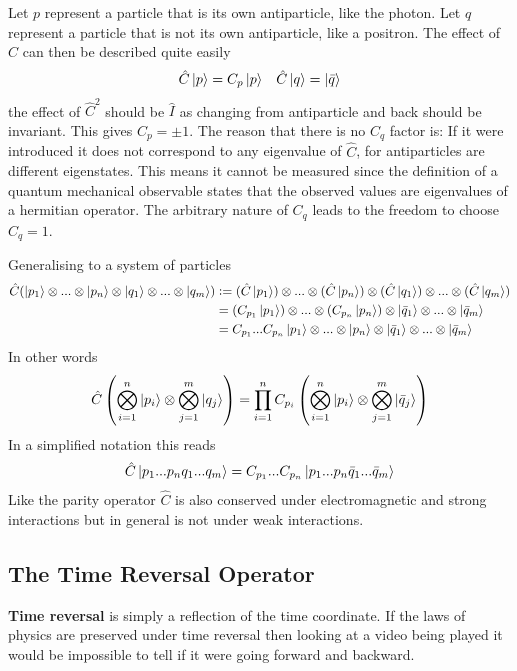 Let $p$ represent a particle that is its own antiparticle, like the photon. Let $q$ represent a particle that is not its own antiparticle, like a positron. The effect of $\hat{C}$ can then be described quite easily
\begin{align*}
&\hat{C}\ket{p} = C_p \ket{p}   &\hat{C}\ket{q} = \ket{\bar{q}}
\end{align*}
the effect of $\hat{C}^2$ should be $\hat{I}$ as changing from antiparticle and back should be invariant. This gives $C_p= \pm 1$. The reason that there is no $C_q$ factor is: If it were introduced it does not correspond to any eigenvalue of $\hat{C}$, for antiparticles are different eigenstates. This means it cannot be measured since the definition of a quantum mechanical observable states that the observed values are eigenvalues of a hermitian operator. The arbitrary nature of $C_q$ leads to the freedom to choose $C_q=1$.

Generalising to a system of particles
\begin{align*}
\hat{C}(\ket{p_1}\otimes...\otimes\ket{p_n}\otimes\ket{q_1}\otimes...\otimes\ket{q_m}) &\vcentcolon= (\hat{C}\ket{p_1})\otimes...\otimes(\hat{C}\ket{p_n})\otimes(\hat{C}\ket{q_1})\otimes...\otimes(\hat{C}\ket{q_m}) \\
&= (C_{p_1}\ket{p_1})\otimes...\otimes(C_{p_n}\ket{p_n})\otimes\ket{\bar{q}_1}\otimes...\otimes\ket{\bar{q}_m}  \\
&= C_{p_1}...C_{p_n}\ket{p_1}\otimes...\otimes\ket{p_n}\otimes\ket{\bar{q}_1}\otimes...\otimes\ket{\bar{q}_m}  
\end{align*}
In other words
\begin{align*}
\hat{C}\left(\bigotimes_{i=1}^n\ket{p_i} \otimes \bigotimes_{j=1}^m \ket{q_j} \right) = \prod_{i=1}^n C_{p_i} \left(\bigotimes_{i=1}^n\ket{p_i} \otimes \bigotimes_{j=1}^m \ket{\bar{q}_j} \right)
\end{align*}
In a simplified notation this reads
\begin{align*}
\hat{C}\ket{p_1...p_nq_1...q_m}=C_{p_1}...C_{p_n}\ket{p_1...p_n\bar{q}_1...\bar{q}_m}
\end{align*}
Like the parity operator $\hat{C}$ is also conserved under electromagnetic and strong interactions but in general is not under weak interactions.

\subsection{The Time Reversal Operator}
\textbf{Time reversal} is simply a reflection of the time coordinate. If the laws of physics are preserved under time reversal then looking at a video being played it would be impossible to tell if it were going forward and backward.

